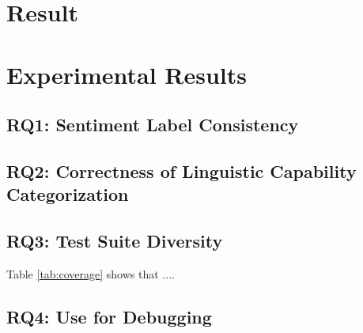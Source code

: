 \section{Result}
\label{sec:result}

\section{Experimental Results}
\label{sec:result}

\subsection{RQ1: \tool Sentiment Label Consistency}


\subsection{RQ2: Correctness of Linguistic Capability Categorization}

\subsection{RQ3: Test Suite Diversity}


Table \ref{tab:coverage} shows that ....

\subsection{RQ4: Use \tool for Debugging}
